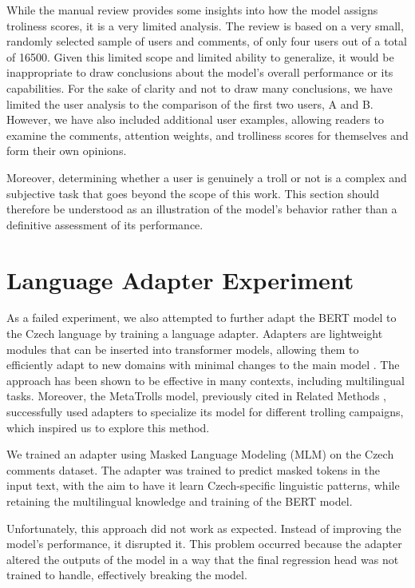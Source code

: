 \documentclass[twoside]{ctuthesis}
\theoremstyle{plain}
\theoremstyle{definition}
\theoremstyle{note}
\begin{document}
While the manual review provides some insights into how the model assigns troliness scores, it is a very limited analysis. The review is based on a very small, randomly selected sample of users and comments, of only four users out of a total of 16500. Given this limited scope and limited ability to generalize, it would be inappropriate to draw conclusions about the model's overall performance or its capabilities. For the sake of clarity and not to draw many conclusions, we have limited the user analysis to the comparison of the first two users, A and B. However, we have also included additional user examples, allowing readers to examine the comments, attention weights, and trolliness scores for themselves and form their own opinions. \par
Moreover, determining whether a user is genuinely a troll or not is a complex and subjective task that goes beyond the scope of this work. This section should therefore be understood as an illustration of the model's behavior rather than a definitive assessment of its performance.\par

\section{Language Adapter Experiment}
As a failed experiment, we also attempted to further adapt the BERT model to the Czech language by training a language adapter. Adapters are lightweight modules that can be inserted into transformer models, allowing them to efficiently adapt to new domains with minimal changes to the main model \cite{Houlsby2019}. The approach has been shown to be effective in many contexts, including multilingual tasks. Moreover, the MetaTrolls model, previously cited in Related Methods \cite{Tian2023}, successfully used adapters to specialize its model for different trolling campaigns, which inspired us to explore this method.\par

We trained an adapter using Masked Language Modeling (MLM) on the Czech comments dataset. The adapter was trained to predict masked tokens in the input text, with the aim to have it learn Czech-specific linguistic patterns, while retaining the multilingual knowledge and training of the BERT model.\par

Unfortunately, this approach did not work as expected. Instead of improving the model's performance, it disrupted it. This problem occurred because the adapter altered the outputs of the model in a way that the final regression head was not trained to handle, effectively breaking the model. \par
 
\end{document}
